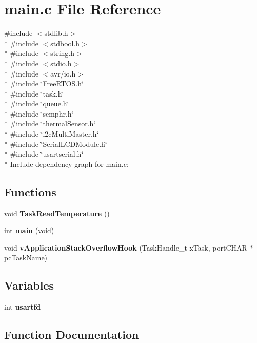 \section{main.\+c File Reference}
\label{main_8c}
{\ttfamily \#include $<$stdlib.\+h$>$}\\*
{\ttfamily \#include $<$stdbool.\+h$>$}\\*
{\ttfamily \#include $<$string.\+h$>$}\\*
{\ttfamily \#include $<$stdio.\+h$>$}\\*
{\ttfamily \#include $<$avr/io.\+h$>$}\\*
{\ttfamily \#include \char`\"{}Free\+R\+T\+O\+S.\+h\char`\"{}}\\*
{\ttfamily \#include \char`\"{}task.\+h\char`\"{}}\\*
{\ttfamily \#include \char`\"{}queue.\+h\char`\"{}}\\*
{\ttfamily \#include \char`\"{}semphr.\+h\char`\"{}}\\*
{\ttfamily \#include \char`\"{}thermal\+Sensor.\+h\char`\"{}}\\*
{\ttfamily \#include \char`\"{}i2c\+Multi\+Master.\+h\char`\"{}}\\*
{\ttfamily \#include \char`\"{}Serial\+L\+C\+D\+Module.\+h\char`\"{}}\\*
{\ttfamily \#include \char`\"{}usartserial.\+h\char`\"{}}\\*
Include dependency graph for main.\+c\+:
\subsection*{Functions}
\begin{DoxyCompactItemize}
\item 
void {\bf Task\+Read\+Temperature} ()
\item 
int {\bf main} (void)
\item 
void {\bf v\+Application\+Stack\+Overflow\+Hook} (Task\+Handle\+\_\+t x\+Task, port\+C\+H\+AR $\ast$pc\+Task\+Name)
\end{DoxyCompactItemize}
\subsection*{Variables}
\begin{DoxyCompactItemize}
\item 
int {\bf usartfd}
\end{DoxyCompactItemize}


\subsection{Function Documentation}
